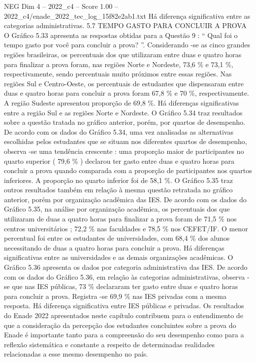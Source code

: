 \begin{textsample}{NEG Dim 4 – 2022\_c4 – Score 1.00 – 2022\_c4/enade\_2022\_tec\_log\_15f82e2ab1.txt}
Há diferença significativa entre as categorias administrativas. 5.7 TEMPO GASTO PARA CONCLUIR A PROVA O Gráfico 5.33 apresenta as respostas obtidas para a Questão 9 : “ Qual foi o tempo gasto por você para concluir a prova? ”.
Considerando -se as cinco grandes regiões brasileiras, os percentuais dos que utilizaram entre duas e quatro horas para finalizar a prova foram, nas regiões Norte e Nordeste, 73,6 \% e 73,1 \%, respectivamente, sendo percentuais muito próximos entre essas regiões.
Nas regiões Sul e Centro-Oeste, os percentuais de estudantes que dispensaram entre duas e quatro horas para concluir a prova foram 67,8 \% e 70 \%, respectivamente.
A região Sudeste apresentou proporção de 69,8 \%.
Há diferenças significativas entre a região Sul e as regiões Norte e Nordeste.
O Gráfico 5.34 traz resultados sobre a questão tratada no gráfico anterior, porém, por quartos de desempenho.
De acordo com os dados do Gráfico 5.34, uma vez analisadas as alternativas escolhidas pelos estudantes que se situam nos diferentes quartos de desempenho, observa -se uma tendência crescente : uma proporção maior de participantes no quarto superior ( 79,6 \% ) declarou ter gasto entre duas e quatro horas para concluir a prova quando comparada com a proporção de participantes nos quartos inferiores.
A proporção no quarto inferior foi de 58,1 \%.
O Gráfico 5.35 traz outros resultados também em relação à mesma questão retratada no gráfico anterior, porém por organização acadêmica das IES.
De acordo com os dados do Gráfico 5.35, na análise por organização acadêmica, os percentuais dos que utilizaram de duas a quatro horas para finalizar a prova foram de 71,5 \% nos centros universitários ; 72,2 \% nas faculdades e 78,5 \% nos CEFET/IF.
O menor percentual foi entre os estudantes de universidades, com 68,4 \% dos alunos necessitando de duas a quatro horas para concluir a prova.
Há diferenças significativas entre as universidades e as demais organizações acadêmicas.
O Gráfico 5.36 apresenta os dados por categoria administrativa das IES.
De acordo com os dados do Gráfico 5.36, em relação às categorias administrativas, observa -se que nas IES públicas, 73 \% declararam ter gasto entre duas e quatro horas para concluir a prova.
Registra -se 69,9 \% nas IES privadas com a mesma resposta.
Há diferença significativa entre IES públicas e privadas.
Os resultados do Enade 2022 apresentados neste capítulo contribuem para o entendimento de que a consideração da percepção dos estudantes concluintes sobre a prova do Enade é importante tanto para a compreensão do seu desempenho como para a reflexão sistemática e constante a respeito de determinadas realidades relacionadas a esse mesmo desempenho no país.

\end{textsample}
